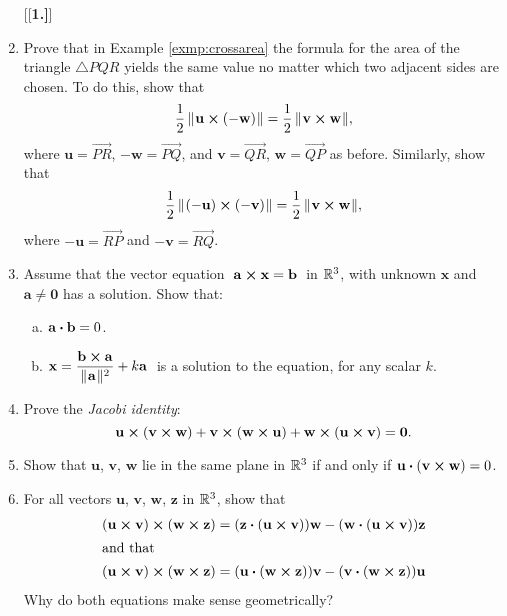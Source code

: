 \begin{enumerate}[\bfseries 1.]
[{[\bfseries 1.]}]
\item
Prove that in Example \ref{exmp:crossarea} the formula for the area of the triangle $\triangle PQR$ 
yields the same value no matter which two adjacent sides are chosen. 
To do this, show that
\[\frac{1}{2}\,\lVert\mspace{1mu}\mathbf{u} \bm{\times} (-\mathbf{w})\mspace{1mu}\rVert = \frac{1}{2}\,\lVert\mspace{1mu}\mathbf{v} \bm{\times} \mathbf{w}\mspace{1mu}\rVert,\]
where 
$\mathbf{u} = \overrightarrow{PR}$, 
$-\mathbf{w} = \overrightarrow{PQ}$, 
and $\mathbf{v} = \overrightarrow{QR}$, 
$\mathbf{w} = \overrightarrow{QP}$ as before. 
Similarly, show that
\[\frac{1}{2}\,\lVert\mspace{1mu}(-\mathbf{u}) \bm{\times} (-\mathbf{v})\mspace{1mu}\rVert =
  \frac{1}{2}\,\lVert\mspace{1mu}\mathbf{v} \bm{\times} \mathbf{w}\mspace{1mu}\rVert,\] 
where 
$-\mathbf{u} = \overrightarrow{RP}$ 
and $-\mathbf{v} = \overrightarrow{RQ}$.
\item 
Assume that the vector equation $\thickspace\mathbf{a} \bm{\times} \mathbf{x} = \mathbf{b}\thickspace$ in $\mathbb{R}^{3}$, 
with unknown $\mathbf{x}$ and $\mathbf{a} \ne \mathbf{0}$ has a solution.
Show that:
  \begin{enumerate}[(a)]
   \item $\mathbf{a} \bm{\cdot} \mathbf{b} = 0$.
   \item $\mathbf{x} = \dfrac{\mathbf{b} \bm{\times} \mathbf{a}}{\lVert\mspace{1mu}\mathbf{a}\mspace{1mu}\rVert^2} + k \mathbf{a}\thickspace$
   is a solution to the equation, for any scalar $k$.
  \end{enumerate}
 \item Prove the \emph{Jacobi identity}:
  \[\mathbf{u} \bm{\times} (\mathbf{v} \bm{\times} \mathbf{w}) +
  \mathbf{v} \bm{\times} (\mathbf{w} \bm{\times} \mathbf{u}) +
  \mathbf{w} \bm{\times} (\mathbf{u} \bm{\times} \mathbf{v}) = \mathbf{0}.\]
 \item Show that $\mathbf{u}$, $\mathbf{v}$, $\mathbf{w}$ lie in the same plane in $\mathbb{R}^{3}$ if and only if
  $\mathbf{u} \bm{\cdot} (\mathbf{v} \bm{\times} \mathbf{w}) = 0$.
 \item For all vectors $\mathbf{u}$, $\mathbf{v}$, $\mathbf{w}$, $\mathbf{z}$ in $\mathbb{R}^{3}$, show that
  \begin{align*}
   (\mathbf{u} \bm{\times} \mathbf{v}) \bm{\times} (\mathbf{w} \bm{\times} \mathbf{z}) &=
    (\mathbf{z} \bm{\cdot} (\mathbf{u} \bm{\times} \mathbf{v}))\mathbf{w} -
    (\mathbf{w} \bm{\cdot} (\mathbf{u} \bm{\times} \mathbf{v}))\mathbf{z}\\
   \intertext{and that}
   (\mathbf{u} \bm{\times} \mathbf{v}) \bm{\times} (\mathbf{w} \bm{\times} \mathbf{z}) &=
    (\mathbf{u} \bm{\cdot} (\mathbf{w} \bm{\times} \mathbf{z}))\mathbf{v} -
    (\mathbf{v} \bm{\cdot} (\mathbf{w} \bm{\times} \mathbf{z}))\mathbf{u}
  \end{align*}
  Why do both equations make sense geometrically?
\end{enumerate}


